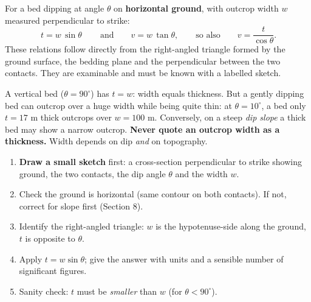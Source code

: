 \documentclass[11pt]{article}
\begin{document}
\begin{propriete}
For a bed dipping at angle $\theta$ on \textbf{horizontal ground}, with outcrop width $w$ measured perpendicular to strike:
\[
\boxed{\,t = w\,\sin\theta\,} \qquad\text{and}\qquad v = w\,\tan\theta , \qquad\text{so also}\qquad v = \dfrac{t}{\cos\theta}.
\]
These relations follow directly from the right-angled triangle formed by the ground surface, the bedding plane and the perpendicular between the two contacts. They are examinable and must be known with a labelled sketch.
\end{propriete}

\begin{attention}
A vertical bed ($\theta = 90^{\circ}$) has $t = w$: width equals thickness. But a gently dipping bed can outcrop over a huge width while being quite thin: at $\theta = 10^{\circ}$, a bed only $t = 17$ m thick outcrops over $w = 100$ m. Conversely, on a steep \emph{dip slope} a thick bed may show a narrow outcrop. \textbf{Never quote an outcrop width as a thickness.} Width depends on dip \emph{and} on topography.
\end{attention}

\begin{methode}
\begin{enumerate}
\item \textbf{Draw a small sketch} first: a cross-section perpendicular to strike showing ground, the two contacts, the dip angle $\theta$ and the width $w$.
\item Check the ground is horizontal (same contour on both contacts). If not, correct for slope first (Section 8).
\item Identify the right-angled triangle: $w$ is the hypotenuse-side along the ground, $t$ is opposite to $\theta$.
\item Apply $t = w\sin\theta$; give the answer with units and a sensible number of significant figures.
\item Sanity check: $t$ must be \emph{smaller} than $w$ (for $\theta < 90^{\circ}$).
\end{enumerate}
\end{methode}
\end{document}
